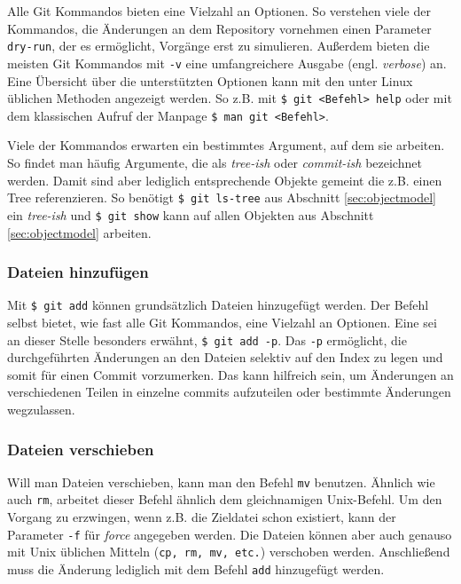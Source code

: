 Alle Git Kommandos bieten eine Vielzahl an Optionen. So verstehen viele der
Kommandos, die Änderungen an dem Repository vornehmen einen Parameter
\texttt{\-{}\-{}dry-run}, der es ermöglicht, Vorgänge erst zu simulieren.
Außerdem bieten die meisten Git Kommandos mit \texttt{-v} eine umfangreichere
Ausgabe (engl. \textit{verbose}) an. Eine Übersicht über die unterstützten
Optionen kann mit den unter Linux üblichen Methoden angezeigt werden. So z.B.
mit \texttt{\$ git <Befehl> help} oder mit dem klassischen Aufruf der Manpage
\texttt{\$ man git <Befehl>}.

Viele der Kommandos erwarten ein bestimmtes Argument, auf dem sie arbeiten. So
findet man häufig Argumente, die als \textit{tree-ish} oder \textit{commit-ish}
bezeichnet werden. Damit sind aber lediglich entsprechende Objekte gemeint die
z.B. einen Tree referenzieren.\cite[52]{gitosp} So benötigt \texttt{\$ git
ls-tree} aus Abschnitt \ref{sec:objectmodel} ein \textit{tree-ish} und
\texttt{\$ git show} kann auf allen Objekten aus Abschnitt
\ref{sec:objectmodel} arbeiten.

\subsubsection{Dateien hinzufügen}\label{sec:gitadd}
Mit \texttt{\$ git add} können grundsätzlich Dateien hinzugefügt werden. Der
Befehl selbst bietet, wie fast alle Git Kommandos, eine Vielzahl an Optionen.
Eine sei an dieser Stelle besonders erwähnt, \texttt{\$ git add -p}. Das
\texttt{-p} ermöglicht, die durchgeführten Änderungen an den Dateien selektiv
auf den Index zu legen und somit für einen Commit vorzumerken. Das kann
hilfreich sein, um Änderungen an verschiedenen Teilen in einzelne
\glspl{commit} aufzuteilen oder bestimmte Änderungen
wegzulassen.\cite[S.~36-37]{gitosp}

\subsubsection{Dateien verschieben} Will man Dateien verschieben, kann man den
Befehl \texttt{mv} benutzen. Ähnlich wie auch \texttt{rm}, arbeitet dieser
Befehl ähnlich dem gleichnamigen Unix-Befehl. Um den Vorgang zu erzwingen, wenn
z.B.  die Zieldatei schon existiert, kann der Parameter \texttt{-f} für
\textit{force} angegeben werden. Die Dateien können aber auch genauso mit Unix
üblichen Mitteln (\texttt{cp, rm, mv, etc.}) verschoben werden. Anschließend
muss die Änderung lediglich mit dem Befehl \texttt{add} hinzugefügt
werden.\cite[S.~43-44]{gitosp}

